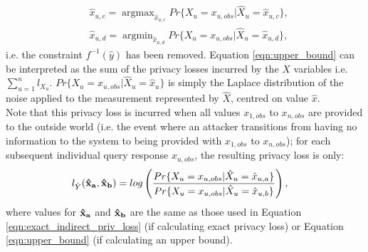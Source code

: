 \documentclass[12pt]{article}
\DeclareMathOperator*{\argmax}{argmax}
\DeclareMathOperator*{\argmin}{argmin}
\begin{document}
\begin{appendix}
\begin{align}
      & \hat{x}_{u,c} = \argmax_{\hat{x}_{u,c}}Pr\{ X_u = x_{u,obs} | \hat{X}_u = \hat{x}_{u,c} \}, \nonumber \\
      & \hat{x}_{u,d} = \argmin_{\hat{x}_{u,d}}Pr\{ X_u = x_{u,obs} | \hat{X}_u = \hat{x}_{u,d} \}, \nonumber
    \end{align}
    i.e. the constraint $f^{-1}(\hat{y})$ has been removed. Equation \ref{eqn:upper_bound} can be interpreted as the sum of the privacy losses incurred by the $X$ variables i.e. $\sum_{u=1}^n l_{X_u}$. $Pr\{ X_u = x_{u,obs} | \hat{X}_u = \hat{x}_u \}$ is simply the Laplace distribution of the noise applied to the measurement represented by $\hat{X}$, centred on value $\hat{x}$.\\

    Note that this privacy loss is incurred when all values $x_{1,obs}$ to $x_{n,obs}$ are provided to the outside world (i.e. the event where an attacker transitions from having no information to the system to being provided with $x_{1,obs}$ to $x_{n,obs}$); for each subsequent individual query response $x_{u,obs}$, the resulting privacy loss is only:
    \begin{align}
      l_{\hat{Y}}(\bf{\hat{x}_a}, \bf{\hat{x}_b}) & = log \left( \frac{Pr\{ X_u = x_{u,obs} | \hat{X}_u = \hat{x}_{u,a} \}} {Pr\{ X_u = x_{u,obs} | \hat{X}_u = \hat{x}_{u,b} \}} \right),
    \end{align}
     where values for $\bf{\hat{x}_a}$ and $\bf{\hat{x}_b}$ are the same as those used in Equation \ref{eqn:exact_indirect_priv_loss} (if calculating exact privacy loss) or Equation \ref{eqn:upper_bound} (if calculating an upper bound).\\


\end{appendix}
\end{document}
